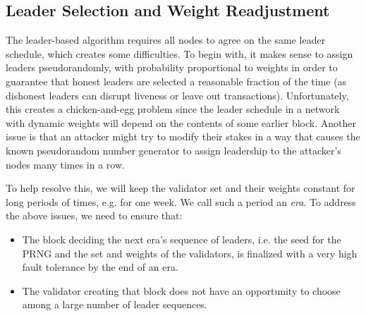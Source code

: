 \documentclass[12pt, fleqn]{article}
\newtheorem{proposition}{Proposition}
\newcommand{\ww}{\mathbb{w}}
\begin{document}
%
%
%


\subsection{Leader Selection and Weight Readjustment}

The leader-based algorithm requires all nodes to agree on the same leader schedule, which creates some difficulties. To begin with, it makes sense to assign leaders pseudorandomly, with probability proportional to weights in order to guarantee that honest leaders are selected a reasonable fraction of the time (as dishonest leaders can disrupt liveness or leave out transactions). Unfortunately, this creates a chicken-and-egg problem since the leader schedule in a network with dynamic weights will depend on the contents of some earlier block. Another issue is that an attacker might try to modify their stakes in a way that causes the known pseudorandom number generator to assign leadership to the attacker's nodes many times in a row.

To help resolve this, we will keep the validator set and their weights constant for long periods of times, e.g. for one week. We call such a period an \emph{era}. To address the above issues, we need to ensure that:
\begin{itemize}
  \item The block deciding the next era's sequence of leaders, i.e. the seed for the PRNG and the set and weights of the validators, is finalized with a very high fault tolerance by the end of an era.
  \item The validator creating that block does not have an opportunity to choose among a large number of leader sequences.
\end{itemize}
\end{document}
